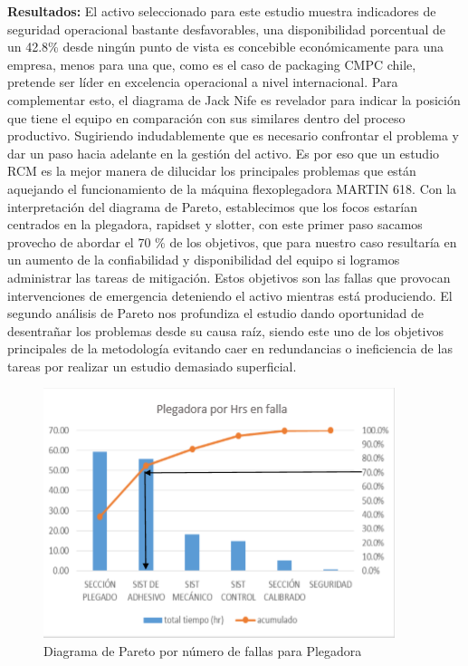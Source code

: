 \begin{description}
\item \textbf{Resultados:} El activo seleccionado para este estudio muestra indicadores de seguridad operacional bastante desfavorables, una disponibilidad porcentual de un 42.8\% desde ningún punto de vista es concebible económicamente para una empresa, menos para una que, como es el caso de packaging CMPC chile, pretende ser líder en excelencia operacional a nivel internacional. Para complementar esto, el diagrama de Jack Nife es revelador para indicar la posición que tiene el equipo en comparación con sus similares dentro del proceso productivo. Sugiriendo indudablemente que es necesario confrontar el problema y dar un paso hacia adelante en la gestión del activo. Es por eso que un estudio RCM es la mejor manera de dilucidar los principales problemas que están aquejando el funcionamiento de la máquina flexoplegadora MARTIN 618.
 Con la interpretación del diagrama de Pareto, establecimos que los focos estarían centrados en la plegadora, rapidset y slotter, con este primer paso sacamos provecho de abordar el 70 \% de los objetivos, que para nuestro caso resultaría en un aumento de la confiabilidad y disponibilidad del equipo si logramos administrar las tareas de mitigación. Estos objetivos son las fallas que provocan intervenciones de emergencia deteniendo el activo mientras está produciendo. El segundo análisis de Pareto nos profundiza el estudio dando oportunidad de desentrañar los problemas desde su causa raíz, siendo este uno de los objetivos principales de la metodología evitando caer en redundancias o ineficiencia de las tareas por realizar un estudio demasiado superficial. 
 
 \begin{figure}[H]
 \centering
 \includegraphics[scale=0.8]{images/plegadorapareto.png}
 \caption{Diagrama de Pareto por número de fallas para Plegadora \parencite{cruz2018}}
 \end{figure}
 

\end{description}
